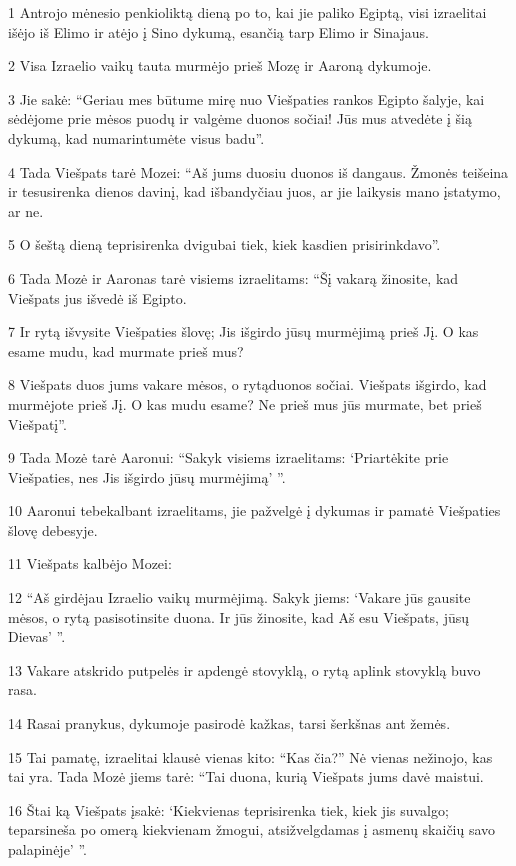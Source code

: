 \par 1 Antrojo mėnesio penkioliktą dieną po to, kai jie paliko Egiptą, visi izraelitai išėjo iš Elimo ir atėjo į Sino dykumą, esančią tarp Elimo ir Sinajaus. 
\par 2 Visa Izraelio vaikų tauta murmėjo prieš Mozę ir Aaroną dykumoje. 
\par 3 Jie sakė: “Geriau mes būtume mirę nuo Viešpaties rankos Egipto šalyje, kai sėdėjome prie mėsos puodų ir valgėme duonos sočiai! Jūs mus atvedėte į šią dykumą, kad numarintumėte visus badu”. 
\par 4 Tada Viešpats tarė Mozei: “Aš jums duosiu duonos iš dangaus. Žmonės teišeina ir tesusirenka dienos davinį, kad išbandyčiau juos, ar jie laikysis mano įstatymo, ar ne. 
\par 5 O šeštą dieną teprisirenka dvigubai tiek, kiek kasdien prisirinkdavo”. 
\par 6 Tada Mozė ir Aaronas tarė visiems izraelitams: “Šį vakarą žinosite, kad Viešpats jus išvedė iš Egipto. 
\par 7 Ir rytą išvysite Viešpaties šlovę; Jis išgirdo jūsų murmėjimą prieš Jį. O kas esame mudu, kad murmate prieš mus? 
\par 8 Viešpats duos jums vakare mėsos, o rytą­duonos sočiai. Viešpats išgirdo, kad murmėjote prieš Jį. O kas mudu esame? Ne prieš mus jūs murmate, bet prieš Viešpatį”. 
\par 9 Tada Mozė tarė Aaronui: “Sakyk visiems izraelitams: ‘Priartėkite prie Viešpaties, nes Jis išgirdo jūsų murmėjimą’ ”. 
\par 10 Aaronui tebekalbant izraelitams, jie pažvelgė į dykumas ir pamatė Viešpaties šlovę debesyje. 
\par 11 Viešpats kalbėjo Mozei: 
\par 12 “Aš girdėjau Izraelio vaikų murmėjimą. Sakyk jiems: ‘Vakare jūs gausite mėsos, o rytą pasisotinsite duona. Ir jūs žinosite, kad Aš esu Viešpats, jūsų Dievas’ ”. 
\par 13 Vakare atskrido putpelės ir apdengė stovyklą, o rytą aplink stovyklą buvo rasa. 
\par 14 Rasai pranykus, dykumoje pasirodė kažkas, tarsi šerkšnas ant žemės. 
\par 15 Tai pamatę, izraelitai klausė vienas kito: “Kas čia?” Nė vienas nežinojo, kas tai yra. Tada Mozė jiems tarė: “Tai duona, kurią Viešpats jums davė maistui. 
\par 16 Štai ką Viešpats įsakė: ‘Kiekvienas teprisirenka tiek, kiek jis suvalgo; teparsineša po omerą kiekvienam žmogui, atsižvelgdamas į asmenų skaičių savo palapinėje’ ”. 
